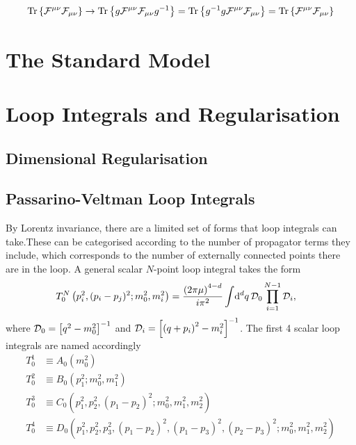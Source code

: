 \documentclass[../main.tex]{subfiles}
\begin{document}
\begin{temporary}
    \begin{equation}
        \operatorname{Tr}\left\{\mathcal{F}^{\mu\nu} \mathcal{F}_{\mu\nu}\right\} \to \operatorname{Tr}\left\{g \mathcal{F}^{\mu\nu} \mathcal{F}_{\mu\nu} g^{-1}\right\} = \operatorname{Tr}\left\{g^{-1} g \mathcal{F}^{\mu\nu} \mathcal{F}_{\mu\nu}\right\} = \operatorname{Tr}\left\{\mathcal{F}^{\mu\nu} \mathcal{F}_{\mu\nu}\right\}
    \end{equation}
\end{temporary}

\section{The Standard Model}

\section{Loop Integrals and Regularisation}

\subsection{Dimensional Regularisation}

\subsection{Passarino-Veltman Loop Integrals}
By Lorentz invariance, there are a limited set of forms that loop integrals can
take. These can be categorised according to the number
of propagator terms they include, which corresponds to the number of externally
connected points there are in the loop. A general scalar \(N\)-point loop
integral takes the form
\begin{align}
    T^N_0\left(p_i^2, (p_i-p_j)^2; m_0^2, m_i^2\right) & = \frac{\left(2\pi \mu\right)^{4-d}}{i \pi^2} \int \!\mathrm{d}^d q\, \mathcal{D}_0 \prod_{i=1}^{N-1} \mathcal{D}_i,
\end{align}
where \(\mathcal{D}_0 = \left[q^2-m_0^2\right]^{-1}\) and \(\mathcal{D}_i = \left[\left(q+p_i\right)^2-m_i^2\right]^{-1}\).
The first 4 scalar loop integrals are named accordingly
\begin{align}
    T^1_0 & \equiv A_0(m_0^2)                                                                           \\
    T^2_0 & \equiv B_0(p_1^2; m_0^2, m_1^2)                                                             \\
    T^3_0 & \equiv C_0(p_1^2, p_2^2, (p_1-p_2)^2; m_0^2, m_1^2, m_2^2)                                  \\
    T^4_0 & \equiv D_0(p_1^2, p_2^2, p_3^2, (p_1-p_2)^2, (p_1-p_3)^2, (p_2-p_3)^2; m_0^2, m_1^2, m_2^2)
\end{align}
\end{document}
